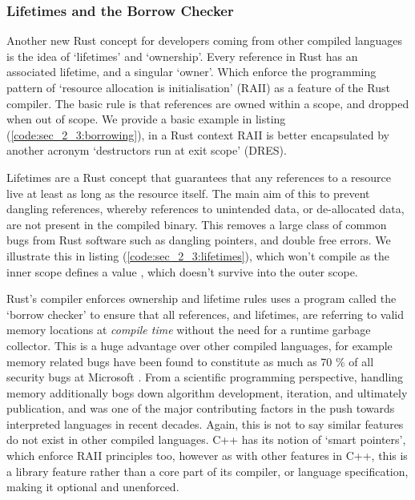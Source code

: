 \subsubsection*{Lifetimes and the Borrow Checker}

Another new Rust concept for developers coming from other compiled languages is the idea of `lifetimes' and `ownership'. Every reference in Rust has an associated lifetime, and a singular `owner'. Which enforce the programming pattern of `resource allocation is initialisation' (RAII) as a feature of the Rust compiler. The basic rule is that references are owned within a scope, and dropped when out of scope. We provide a basic example in listing (\ref{code:sec_2_3:borrowing}), in a Rust context RAII is better encapsulated by another acronym `destructors run at exit scope' (DRES). 


Lifetimes are a Rust concept that guarantees that any references to a resource live at least as long as the resource itself. The main aim of this to prevent dangling references, whereby references to unintended data, or de-allocated data, are not present in the compiled binary. This removes a large class of common bugs from Rust software such as dangling pointers, and double free errors. We illustrate this in listing (\ref{code:sec_2_3:lifetimes}), which won't compile as the inner scope defines a value , which doesn't survive into the outer scope. 


Rust's compiler enforces ownership and lifetime rules uses a program called the `borrow checker' to ensure that all references, and lifetimes, are referring to valid memory locations at \textit{compile time} without the need for a runtime garbage collector. This is a huge advantage over other compiled languages, for example memory related bugs have been found to constitute as much as 70 \% of all security bugs at Microsoft \cite{microsoft2019}. From a scientific programming perspective, handling memory additionally bogs down algorithm development, iteration, and ultimately publication, and was one of the major contributing factors in the push towards interpreted languages in recent decades. Again, this is not to say similar features do not exist in other compiled languages. C++ has its notion of `smart pointers', which enforce RAII principles too, however as with other features in C++, this is a library feature rather than a core part of its compiler, or language specification, making it optional and unenforced. 

